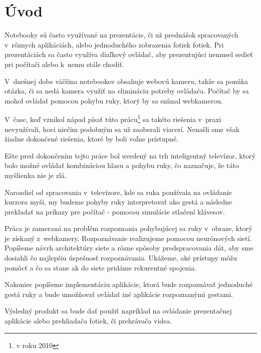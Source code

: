 {}
{}
\chapter*{Úvod}\label{chap:intro}
Notebooky sú často využívané na prezentácie, či už prednášok spracovaných v~rôznych aplikáciách, alebo jednoduchého zobrazenia fotiek fotiek. Pri prezentáciách sa často využíva diaľkový ovládač, aby prezentujúci nemusel sedieť pri počítači alebo k~nemu stále chodiť.

V~dnešnej dobe väčšina notebookov obsahuje webovú kameru, takže sa ponúka otázka, či sa nedá kamera využiť na elimináciu potreby ovládača. Počítač by sa mohol ovládať pomocou pohybu ruky, ktorý by sa snímal webkamerou.

V~čase, keď vznikol nápad písať túto prácu\footnote{v roku 2010} sa takéto riešenia v~praxi nevyužívali, hoci niečim podobným sa už zaoberali viacerí. Nenašli sme však žiadne dokončené riešenia, ktoré by boli voľne prístupné.

Ešte pred dokončením tejto práce bol uvedený na trh inteligentný televízor, ktorý bolo možné ovládať kombináciou hlasu a pohybu ruky, čo naznačuje, že táto myšlienka nie je zlá. 

Narozdiel od spracovania v~televízore, kde sa ruka používala na ovládanie kurzora myši, my budeme pohyby ruky interpretovať ako gestá a následne prekladať na príkazy pre počítač - pomocou simulácie stlačení klávesov.

Práca je zameraná na problém rozpoznania pohybujúcej sa ruky v~obraze, ktorý je získaný z~webkamery. Rozpoznávanie realizujeme pomocou neurónových sietí. Popíšeme  návrh architektúry siete a rôzne spôsoby predspracovania dát, aby sme dosiahli čo najlepšiu úspešnosť rozpoznávania. Ukážeme, aké prístupy môžu pomôcť a čo sa stane ak do siete pridáme rekurentné spojenia. 

Nakoniec popíšeme implementáciu aplikácie, ktorá bude rozpoznávať jednoduché gestá ruky a bude umožňovať ovládať iné aplikácie rozpoznanými gestami.

Výsledný produkt sa bude dať použiť napríklad na ovládanie prezentačnej aplikácie alebo prehliadača fotiek, či prehrávača videa.